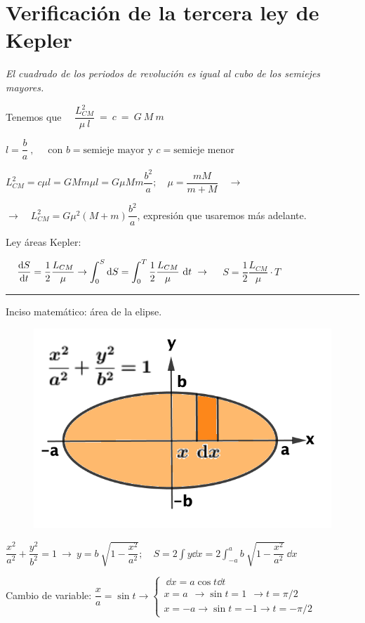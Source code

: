 \section[Verificación de la tercera ley de Kepler]{Verificación de la tercera ley de Kepler}

\emph{El cuadrado de los periodos de revolución es igual al cubo de los semiejes mayores.}


Tenemos que $\quad \dfrac {L^2_{CM}}{\mu\ l}\ = \ c\ = \ G\ M\ m$

$l=\dfrac b a\ , \quad \text{ con } b=\text{semieje mayor y }c=\text{semieje menor}$

$L^2_{CM}=c\mu l=GMm\mu l=G\mu M m \dfrac {b^2}{a}; \quad \mu=\dfrac{mM}{m+M} \quad \to $

$\to \quad  L^2_{CM}=G\mu^2 (M+m) \dfrac {b^2}{a}$, expresión que usaremos más adelante.

Ley áreas Kepler: 

$\displaystyle \quad \dv{S}{t}=\dfrac 1 2 \dfrac {L_{CM}}{\mu} \to \int_0^S \dd S = \int_0^T \dfrac 1 2 \dfrac {L_{CM}}{\mu} \ \dd t \ \to $
$\displaystyle \quad S= \dfrac 1 2 \dfrac{L_{CM}}{\mu}\cdot T$


\textcolor{gris}{\rule{50mm}{0.4pt} \hspace{5mm} Inciso matemático: área de la elipse.}
\begin{multicols}{2}
\begin{figure}[H]
	\centering
	\includegraphics[width=.5\textwidth]{imagenes/imagenes14/T14IM06.png}
\end{figure}
$\dfrac {x^2}{a^2}+\dfrac{y^2}{b^2}=1 \ \to \ y=b\ \sqrt{1-\dfrac{x^2}{a^2}};\quad S=2 \int y \dd x = \displaystyle 2\int_{-a}^{a} b\  \sqrt{1-\dfrac{x^2}{a^2}} \ \dd x$
\end{multicols}

Cambio de variable: $\dfrac x a =\sin t \to \begin{cases}
\ \dd x= a \cos t \dd t \\
x=a \ \ \to \sin t = 1\ \  \to t=\pi/2 \\
x=-a \to \sin t = -1 \to t=-\pi/2  	
 \end{cases}$

